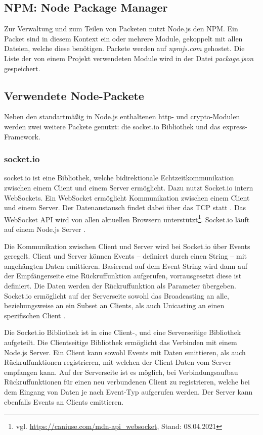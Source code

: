 \subsection{NPM: Node Package Manager}
Zur Verwaltung und zum Teilen von Packeten nutzt Node.js den \ac{NPM}. Ein Packet sind in diesem Kontext ein oder mehrere Module, gekoppelt mit allen Dateien, welche diese benötigen. Packete werden auf \textit{npmjs.com} gehostet. Die Liste der von einem Projekt verwendeten Module wird in der Datei \textit{package.json} gespeichert.

\subsection{Verwendete Node-Packete}
Neben den standartmäßig in Node.js enthaltenen \glqq{}http\grqq{}- und \glqq{}crypto\grqq{}-Modulen werden zwei weitere Packete genutzt: die \glqq{}socket.io\grqq{} Bibliothek und das \glqq{}express\grqq{}-Framework.

\subsubsection{socket.io}
\glqq{}socket.io\grqq{} ist eine Bibliothek, welche bidirektionale Echtzeitkommunikation zwischen einem Client und einem Server ermöglicht. Dazu nutzt Socket.io intern WebSockets\cite{socketio}. Ein WebSocket ermöglicht Kommunikation zwischen einem Client und einem Server. Der Datenaustausch findet dabei über das \ac{TCP} statt \cite{websocketRFC}. Das WebSocket \ac{API} wird von allen aktuellen Browsern unterstützt\footnote{vgl. \url{https://caniuse.com/mdn-api_websocket}, Stand: 08.04.2021}. Socket.io läuft auf einem Node.js Server \cite{socketio}.\par

Die Kommunikation zwischen Client und Server wird bei Socket.io über Events geregelt. Client und Server können Events -- definiert durch einen String -- mit angehängten Daten emittieren. Basierend auf dem Event-String wird dann auf der Empfängerseite eine Rückruffunktion aufgerufen, vorrausgesetzt diese ist definiert. Die Daten werden der Rückruffunktion als Parameter übergeben. Socket.io ermöglicht auf der Serverseite sowohl das Broadcasting an alle, beziehungsweise an ein Subset an Clients, als auch Unicasting an einen spezifischen Client \cite{socketio}.\par

Die Socket.io Bibliothek ist in eine Client-, und eine Serverseitige Bibliothek aufgeteilt. Die Clientseitige Bibliothek ermöglicht das Verbinden mit einem Node.js Server. Ein Client kann sowohl Events mit Daten emittieren, als auch Rückruffunktionen registrieren, mit welchen der Client Daten vom Server empfangen kann. Auf der Serverseite ist es möglich, bei Verbindungsaufbau Rückruffunktionen für einen neu verbundenen Client zu registrieren, welche bei dem Eingang von Daten je nach Event-Typ aufgerufen werden. Der Server kann ebenfalls Events an Clients emittieren.

